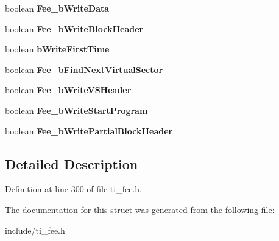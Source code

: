 \begin{DoxyCompactItemize}
boolean {\bfseries Fee\+\_\+b\+Write\+Data}
\item 
\mbox{\label{structTI__Fee__GlobalVarsType_a750c77e9edaa7054fe8ec56c3be662bf}} 
boolean {\bfseries Fee\+\_\+b\+Write\+Block\+Header}
\item 
\mbox{\label{structTI__Fee__GlobalVarsType_a0dc90886e57a7d89de0066476055ae1b}} 
boolean {\bfseries b\+Write\+First\+Time}
\item 
\mbox{\label{structTI__Fee__GlobalVarsType_a5643ef7fea664982130d18b69cecb736}} 
boolean {\bfseries Fee\+\_\+b\+Find\+Next\+Virtual\+Sector}
\item 
\mbox{\label{structTI__Fee__GlobalVarsType_a9a006851f3dd3d6676d78903c2423ca1}} 
boolean {\bfseries Fee\+\_\+b\+Write\+V\+S\+Header}
\item 
\mbox{\label{structTI__Fee__GlobalVarsType_a15e92d3d28695a99df82c2d46d3ac177}} 
boolean {\bfseries Fee\+\_\+b\+Write\+Start\+Program}
\item 
\mbox{\label{structTI__Fee__GlobalVarsType_a129d7a2efc5e5e636d21a7640be1c55d}} 
boolean {\bfseries Fee\+\_\+b\+Write\+Partial\+Block\+Header}
\end{DoxyCompactItemize}


\subsection{Detailed Description}


Definition at line 300 of file ti\+\_\+fee.\+h.



The documentation for this struct was generated from the following file\+:\begin{DoxyCompactItemize}
\item 
include/ti\+\_\+fee.\+h\end{DoxyCompactItemize}
